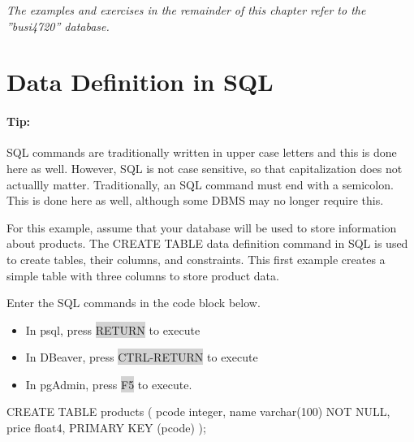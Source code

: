 \begin{tcolorbox}[colback=alert]
\noindent \emph{The examples and exercises in the remainder of this chapter refer to the ''busi4720'' database.}
\end{tcolorbox}

\section{Data Definition in SQL}

\begin{tcolorbox}[colback=code]
\paragraph*{Tip:} SQL commands are traditionally written in upper case letters and this is done here as well. However, SQL is not case sensitive, so that capitalization does not actuallly matter. Traditionally, an SQL command must end with a semicolon. This is done here as well, although some DBMS may no longer require this. 
\end{tcolorbox}

For this example, assume that your database will be used to store information about products. The CREATE TABLE data definition command in SQL is used to create tables, their columns, and constraints. This first example creates a simple table with three columns to store product data.

\begin{tcolorbox}[colback=code]
Enter the SQL commands in the code block below.
\begin{itemize}
   \item In psql, press \colorbox{lightgray}{RETURN} to execute
   \item In DBeaver, press \colorbox{lightgray}{CTRL-RETURN} to execute
   \item In pgAdmin, press \colorbox{lightgray}{F5} to execute.
\end{itemize}
\end{tcolorbox}

\begin{samepage}
\begin{sqlcode}
CREATE TABLE products (
  pcode integer,
  name  varchar(100) NOT NULL,
  price float4,
  PRIMARY KEY (pcode) 
);
\end{sqlcode}
\end{samepage}

